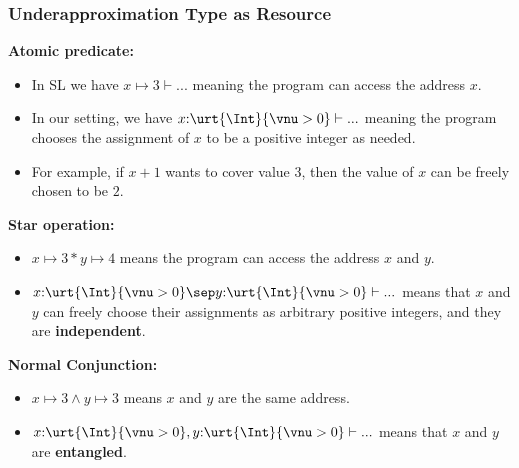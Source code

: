 \begin{frame}[fragile]
    \frametitle{Underapproximation Type as Resource}

\textbf{Atomic predicate:}
\begin{itemize}
    \item In SL we have $x\mapsto 3 \vdash ...$ meaning the program can access the address $x$.
    \item In our setting, we have $x{:}\urt{\Int}{\vnu > 0} \vdash ...$ meaning the program chooses the assignment of $x$ to be a positive integer as needed.
    \item For example, if $x + 1$ wants to cover value $3$, then the value of $x$ can be freely chosen to be $2$.
\end{itemize}

\textbf{Star operation:}
\begin{itemize}
    \item $x\mapsto 3 * y\mapsto 4$ means the program can access the address $x$ and $y$.
    \item $x{:}\urt{\Int}{\vnu > 0} \sep y{:}\urt{\Int}{\vnu > 0} \vdash ...$ means that $x$ and $y$ can freely choose their assignments as arbitrary positive integers, and they are \textbf{independent}.
\end{itemize}

\textbf{Normal Conjunction:}
\begin{itemize}
    \item $x\mapsto 3 \land y\mapsto 3$ means $x$ and $y$ are the same address.
    \item $x{:}\urt{\Int}{\vnu > 0}, y{:}\urt{\Int}{\vnu > 0} \vdash ...$ means that $x$ and $y$ are \textbf{entangled}.
\end{itemize}

\end{frame}


